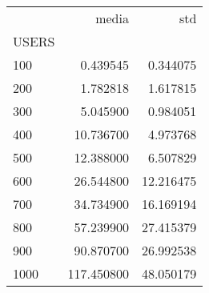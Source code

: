 \begin{tabular}{lrr}
\toprule
{} &       media &        std \\
USERS &             &            \\
\midrule
100   &    0.439545 &   0.344075 \\
200   &    1.782818 &   1.617815 \\
300   &    5.045900 &   0.984051 \\
400   &   10.736700 &   4.973768 \\
500   &   12.388000 &   6.507829 \\
600   &   26.544800 &  12.216475 \\
700   &   34.734900 &  16.169194 \\
800   &   57.239900 &  27.415379 \\
900   &   90.870700 &  26.992538 \\
1000  &  117.450800 &  48.050179 \\
\bottomrule
\end{tabular}
